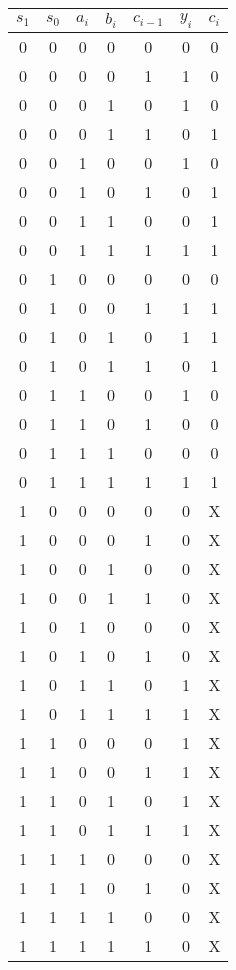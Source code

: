 \documentclass{CInf_practice}
\begin{document}
\cinftitle

\subex{}
\begin{tabular}{cc|ccc||cc}
   $s_1$ & $s_0$ & $a_i$ & $b_i$ & $c_{i-1}$ & $y_i$ & $c_i$ \\\hline
0 & 0 & 0 & 0 & 0 & 0 & 0 \\
0 & 0 & 0 & 0 & 1 & 1 & 0 \\
0 & 0 & 0 & 1 & 0 & 1 & 0 \\
0 & 0 & 0 & 1 & 1 & 0 & 1 \\
0 & 0 & 1 & 0 & 0 & 1 & 0 \\
0 & 0 & 1 & 0 & 1 & 0 & 1 \\
0 & 0 & 1 & 1 & 0 & 0 & 1 \\
0 & 0 & 1 & 1 & 1 & 1 & 1 \\
0 & 1 & 0 & 0 & 0 & 0 & 0 \\
0 & 1 & 0 & 0 & 1 & 1 & 1 \\
0 & 1 & 0 & 1 & 0 & 1 & 1 \\
0 & 1 & 0 & 1 & 1 & 0 & 1 \\
0 & 1 & 1 & 0 & 0 & 1 & 0 \\
0 & 1 & 1 & 0 & 1 & 0 & 0 \\
0 & 1 & 1 & 1 & 0 & 0 & 0 \\
0 & 1 & 1 & 1 & 1 & 1 & 1 \\
1 & 0 & 0 & 0 & 0 & 0 & X \\
1 & 0 & 0 & 0 & 1 & 0 & X \\
1 & 0 & 0 & 1 & 0 & 0 & X \\
1 & 0 & 0 & 1 & 1 & 0 & X \\
1 & 0 & 1 & 0 & 0 & 0 & X \\
1 & 0 & 1 & 0 & 1 & 0 & X \\
1 & 0 & 1 & 1 & 0 & 1 & X \\
1 & 0 & 1 & 1 & 1 & 1 & X \\
1 & 1 & 0 & 0 & 0 & 1 & X \\
1 & 1 & 0 & 0 & 1 & 1 & X \\
1 & 1 & 0 & 1 & 0 & 1 & X \\
1 & 1 & 0 & 1 & 1 & 1 & X \\
1 & 1 & 1 & 0 & 0 & 0 & X \\
1 & 1 & 1 & 0 & 1 & 0 & X \\
1 & 1 & 1 & 1 & 0 & 0 & X \\
1 & 1 & 1 & 1 & 1 & 0 & X 
\end{tabular}
\end{document}
